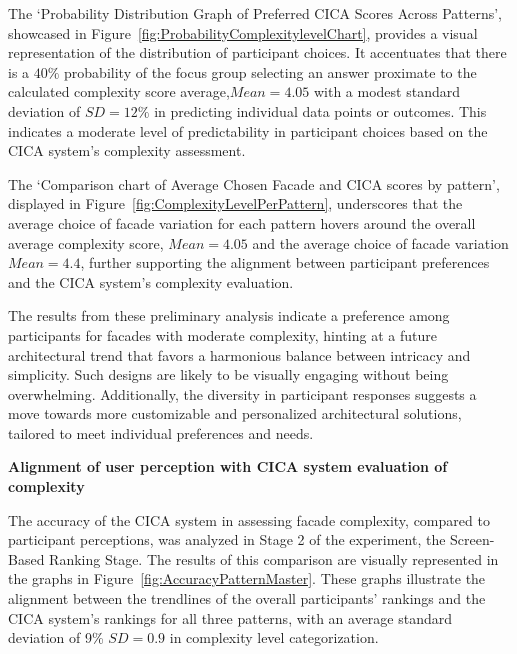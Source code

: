 
The `Probability Distribution Graph of Preferred CICA Scores Across Patterns', showcased in Figure~\ref{fig:ProbabilityComplexitylevelChart}, provides a visual representation of the distribution of participant choices.
It accentuates that there is a \(40\%\) probability of the focus group selecting an answer proximate to the calculated complexity score average,\(Mean = 4.05\) with a modest standard deviation of \(SD = 12\%\) in predicting individual data points or outcomes.
 This indicates a moderate level of predictability in participant choices based on the CICA system's complexity assessment.


The `Comparison chart of Average Chosen Facade and CICA scores by pattern', displayed in Figure~\ref{fig:ComplexityLevelPerPattern}, underscores that the average choice of facade variation for each pattern hovers around the overall average complexity score, \(Mean = 4.05\) and the average choice of facade variation \(Mean = 4.4\), further supporting the alignment between participant preferences and the CICA system's complexity evaluation.


The results from these preliminary analysis indicate a preference among participants for facades with moderate complexity, hinting at a future architectural trend that favors a harmonious balance between intricacy and simplicity.
Such designs are likely to be visually engaging without being overwhelming.
Additionally, the diversity in participant responses suggests a move towards more customizable and personalized architectural solutions, tailored to meet individual preferences and needs.

\textbf{Alignment of user perception with CICA system evaluation of complexity}

The accuracy of the CICA system in assessing facade complexity, compared to participant perceptions, was analyzed in Stage 2 of the experiment, the Screen-Based Ranking Stage.
The results of this comparison are visually represented in the graphs in Figure~\ref{fig:AccuracyPatternMaster}.
These graphs illustrate the alignment between the trendlines of the overall participants' rankings and the CICA system's rankings for all three patterns, with an average standard deviation of 9\% \(SD = 0.9\) in complexity level categorization.

